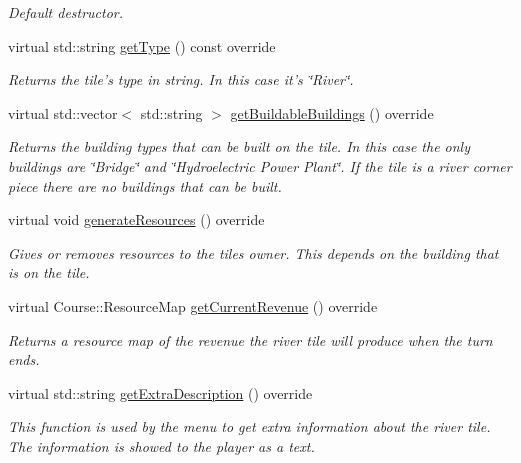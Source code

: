 \begin{DoxyCompactItemize}
\begin{DoxyCompactList}\small\item\em Default destructor. \end{DoxyCompactList}\item 
virtual std\-::string \hyperlink{class_student_1_1_river_a227a22ecd8983eb71188fd5256f28068}{get\-Type} () const override
\begin{DoxyCompactList}\small\item\em Returns the tile's type in string. In this case it's \char`\"{}\-River\char`\"{}. \end{DoxyCompactList}\item 
virtual std\-::vector$<$ std\-::string $>$ \hyperlink{class_student_1_1_river_a344d4b10bcccb02a45bc9db8e81d5547}{get\-Buildable\-Buildings} () override
\begin{DoxyCompactList}\small\item\em Returns the building types that can be built on the tile. In this case the only buildings are \char`\"{}\-Bridge\char`\"{} and \char`\"{}\-Hydroelectric Power Plant\char`\"{}. If the tile is a river corner piece there are no buildings that can be built. \end{DoxyCompactList}\item 
virtual void \hyperlink{class_student_1_1_river_ae5349df4c84b6ec7a6ccf0e31d968dbb}{generate\-Resources} () override
\begin{DoxyCompactList}\small\item\em Gives or removes resources to the tiles owner. This depends on the building that is on the tile. \end{DoxyCompactList}\item 
virtual Course\-::\-Resource\-Map \hyperlink{class_student_1_1_river_a11312fc3638a2b69f27291f1cb8a66ed}{get\-Current\-Revenue} () override
\begin{DoxyCompactList}\small\item\em Returns a resource map of the revenue the river tile will produce when the turn ends. \end{DoxyCompactList}\item 
virtual std\-::string \hyperlink{class_student_1_1_river_ac4abdccfecd49596efac3bb7fda0c008}{get\-Extra\-Description} () override
\begin{DoxyCompactList}\small\item\em This function is used by the menu to get extra information about the river tile. The information is showed to the player as a text. \end{DoxyCompactList}\item 

\end{DoxyCompactItemize}
